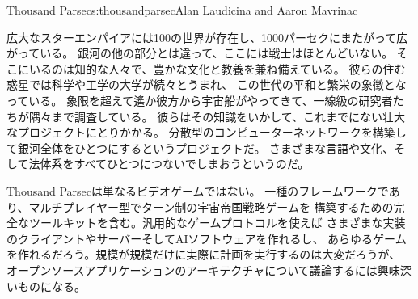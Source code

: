 \begin{aosachapter}{Thousand Parsec}{s:thousandparsec}{Alan Laudicina and Aaron Mavrinac}

広大なスターエンパイアには100の世界が存在し、1000パーセクにまたがって広がっている。
銀河の他の部分とは違って、ここには戦士はほとんどいない。
そこにいるのは知的な人々で、豊かな文化と教養を兼ね備えている。
彼らの住む惑星では科学や工学の大学が続々とうまれ、
この世代の平和と繁栄の象徴となっている。
象限を超えて遙か彼方から宇宙船がやってきて、一線級の研究者たちが隅々まで調査している。
彼らはその知識をいかして、これまでにない壮大なプロジェクトにとりかかる。
分散型のコンピューターネットワークを構築して銀河全体をひとつにするというプロジェクトだ。
さまざまな言語や文化、そして法体系をすべてひとつにつないでしまおうというのだ。

Thousand Parsecは単なるビデオゲームではない。
一種のフレームワークであり、マルチプレイヤー型でターン制の宇宙帝国戦略ゲームを
構築するための完全なツールキットを含む。汎用的なゲームプロトコルを使えば
さまざまな実装のクライアントやサーバーそしてAIソフトウェアを作れるし、
あらゆるゲームを作れるだろう。規模が規模だけに実際に計画を実行するのは大変だろうが、
オープンソースアプリケーションのアーキテクチャについて議論するには興味深いものになる。


\end{aosachapter}
